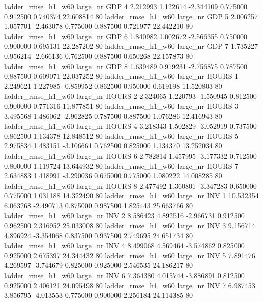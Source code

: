  ladder_rmse_h1_w60   large_nr      GDP                 4  2.212993  1.122614  -2.344109 0.775000 0.912500  0.740374   22.608814 80
 ladder_rmse_h1_w60   large_nr      GDP                 5  2.006257  1.057701  -2.463078 0.775000 0.887500  0.721977   22.442210 80
 ladder_rmse_h1_w60   large_nr      GDP                 6  1.840982  1.002672  -2.566355 0.750000 0.900000  0.695131   22.287202 80
 ladder_rmse_h1_w60   large_nr      GDP                 7  1.735227  0.956214  -2.666136 0.762500 0.887500  0.650268   22.157873 80
 ladder_rmse_h1_w60   large_nr      GDP                 8  1.639489  0.919231  -2.756875 0.787500 0.887500  0.609071   22.037252 80
 ladder_rmse_h1_w60   large_nr    HOURS                 1  2.249621  1.227985  -0.859952 0.862500 0.950000  0.619198   11.520803 80
 ladder_rmse_h1_w60   large_nr    HOURS                 2  2.324065  1.220793  -1.550945 0.812500 0.900000  0.771316   11.877851 80
 ladder_rmse_h1_w60   large_nr    HOURS                 3  3.495568  1.486062  -2.962825 0.787500 0.887500  1.076286   12.416943 80
 ladder_rmse_h1_w60   large_nr    HOURS                 4  3.218343  1.502829  -3.052919 0.737500 0.862500  1.134378   12.848512 80
 ladder_rmse_h1_w60   large_nr    HOURS                 5  2.975834  1.483151  -3.106661 0.762500 0.825000  1.134370   13.252034 80
 ladder_rmse_h1_w60   large_nr    HOURS                 6  2.782814  1.457995  -3.177332 0.712500 0.800000  1.119724   13.644932 80
 ladder_rmse_h1_w60   large_nr    HOURS                 7  2.634883  1.418991  -3.290036 0.675000 0.775000  1.080222   14.008285 80
 ladder_rmse_h1_w60   large_nr    HOURS                 8  2.477492  1.360801  -3.347283 0.650000 0.775000  1.031188   14.322490 80
 ladder_rmse_h1_w60   large_nr      INV                 1 10.532354  6.063268  -2.490713 0.875000 0.987500  1.825443   25.663766 80
 ladder_rmse_h1_w60   large_nr      INV                 2  8.586423  4.892516  -2.966731 0.912500 0.962500  2.316952   25.033008 80
 ladder_rmse_h1_w60   large_nr      INV                 3  9.156714  4.896924  -3.354068 0.837500 0.937500  2.749695   24.651734 80
 ladder_rmse_h1_w60   large_nr      INV                 4  8.499068  4.569464  -3.574862 0.825000 0.925000  2.675397   24.344432 80
 ladder_rmse_h1_w60   large_nr      INV                 5  7.891476  4.269597  -3.744679 0.825000 0.925000  2.546535   24.186217 80
 ladder_rmse_h1_w60   large_nr      INV                 6  7.364380  4.015744  -3.886891 0.812500 0.925000  2.406121   24.095498 80
 ladder_rmse_h1_w60   large_nr      INV                 7  6.987453  3.856795  -4.013553 0.775000 0.900000  2.256184   24.114385 80
